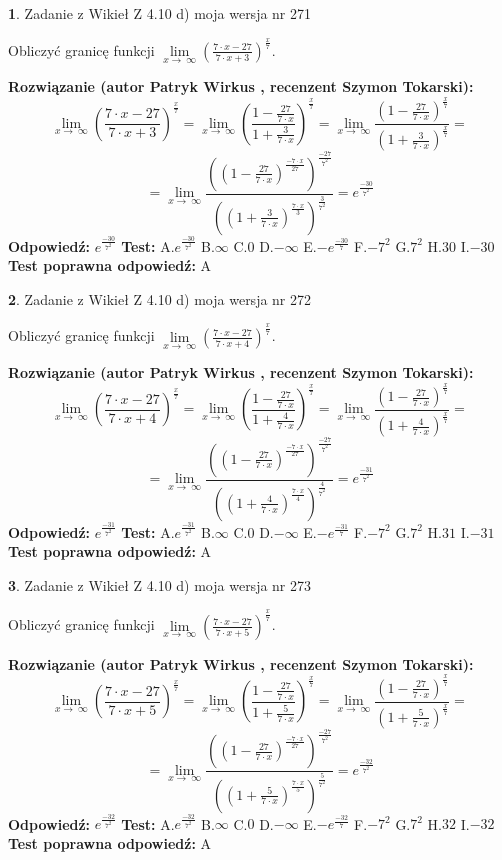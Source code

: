 \documentclass[12pt, a4paper]{article}
\theoremstyle{definition} %
\newtheorem{zad}{}
\newcommand{\zadStart}[1]{\begin{zad}#1\newline}
\newcommand{\zadStop}{\end{zad}}
\newcommand{\rozwStart}[2]{\noindent \textbf{Rozwiązanie (autor #1 , recenzent #2): }\newline}
\newcommand{\rozwStop}{\newline}
\newcommand{\odpStart}{\noindent \textbf{Odpowiedź:}\newline}
\newcommand{\odpStop}{\newline}
\newcommand{\testStart}{\noindent \textbf{Test:}\newline}
\newcommand{\testStop}{\newline}
\newcommand{\kluczStart}{\noindent \textbf{Test poprawna odpowiedź:}\newline}
\newcommand{\kluczStop}{\newline}
\begin{document}
\zadStart{Zadanie z Wikieł Z 4.10 d) moja wersja nr 271}


Obliczyć granicę funkcji  $\lim\limits_{x\to\ \infty}(\frac{7\cdot x-27}{7\cdot x+3})^{\frac{x}{7}}$.
\zadStop
\rozwStart{Patryk Wirkus}{Szymon Tokarski}
$$\lim\limits_{x\to\ \infty}(\frac{7\cdot x-27}{7\cdot x+3})^{\frac{x}{7}} = \lim\limits_{x\to\ \infty}(\frac{1-\frac{27}{7\cdot x}}{1+\frac{3}{7\cdot x}})^{\frac{x}{7}}=\lim\limits_{x\to\ \infty}\frac{(1-\frac{27}{7\cdot x})^{\frac{x}{7}}}{(1+\frac{3}{7\cdot x})^{\frac{x}{7}}}=$$
$$=\lim\limits_{x\to\ \infty}\frac{((1-\frac{27}{7\cdot x})^{\frac{-7\cdot x}{27}})^{\frac{-27}{7^{2}}}}{((1+\frac{3}{7\cdot x})^{\frac{7\cdot x}{3}})^{\frac{3}{7^{2}}}}=e^{\frac{-30}{7^{2}}}$$
\rozwStop
\odpStart
$e^{\frac{-30}{7^{2}}}$
\odpStop
\testStart
A.$e^{\frac{-30}{7^{2}}}$ B.$\infty$ C.$0$ D.$-\infty$ E.$-e^{\frac{-30}{7}}$
F.$-7^{2}$ G.$7^{2}$
H.$30$
I.$-30$
\testStop
\kluczStart
A
\kluczStop



\zadStart{Zadanie z Wikieł Z 4.10 d) moja wersja nr 272}


Obliczyć granicę funkcji  $\lim\limits_{x\to\ \infty}(\frac{7\cdot x-27}{7\cdot x+4})^{\frac{x}{7}}$.
\zadStop
\rozwStart{Patryk Wirkus}{Szymon Tokarski}
$$\lim\limits_{x\to\ \infty}(\frac{7\cdot x-27}{7\cdot x+4})^{\frac{x}{7}} = \lim\limits_{x\to\ \infty}(\frac{1-\frac{27}{7\cdot x}}{1+\frac{4}{7\cdot x}})^{\frac{x}{7}}=\lim\limits_{x\to\ \infty}\frac{(1-\frac{27}{7\cdot x})^{\frac{x}{7}}}{(1+\frac{4}{7\cdot x})^{\frac{x}{7}}}=$$
$$=\lim\limits_{x\to\ \infty}\frac{((1-\frac{27}{7\cdot x})^{\frac{-7\cdot x}{27}})^{\frac{-27}{7^{2}}}}{((1+\frac{4}{7\cdot x})^{\frac{7\cdot x}{4}})^{\frac{4}{7^{2}}}}=e^{\frac{-31}{7^{2}}}$$
\rozwStop
\odpStart
$e^{\frac{-31}{7^{2}}}$
\odpStop
\testStart
A.$e^{\frac{-31}{7^{2}}}$ B.$\infty$ C.$0$ D.$-\infty$ E.$-e^{\frac{-31}{7}}$
F.$-7^{2}$ G.$7^{2}$
H.$31$
I.$-31$
\testStop
\kluczStart
A
\kluczStop



\zadStart{Zadanie z Wikieł Z 4.10 d) moja wersja nr 273}


Obliczyć granicę funkcji  $\lim\limits_{x\to\ \infty}(\frac{7\cdot x-27}{7\cdot x+5})^{\frac{x}{7}}$.
\zadStop
\rozwStart{Patryk Wirkus}{Szymon Tokarski}
$$\lim\limits_{x\to\ \infty}(\frac{7\cdot x-27}{7\cdot x+5})^{\frac{x}{7}} = \lim\limits_{x\to\ \infty}(\frac{1-\frac{27}{7\cdot x}}{1+\frac{5}{7\cdot x}})^{\frac{x}{7}}=\lim\limits_{x\to\ \infty}\frac{(1-\frac{27}{7\cdot x})^{\frac{x}{7}}}{(1+\frac{5}{7\cdot x})^{\frac{x}{7}}}=$$
$$=\lim\limits_{x\to\ \infty}\frac{((1-\frac{27}{7\cdot x})^{\frac{-7\cdot x}{27}})^{\frac{-27}{7^{2}}}}{((1+\frac{5}{7\cdot x})^{\frac{7\cdot x}{5}})^{\frac{5}{7^{2}}}}=e^{\frac{-32}{7^{2}}}$$
\rozwStop
\odpStart
$e^{\frac{-32}{7^{2}}}$
\odpStop
\testStart
A.$e^{\frac{-32}{7^{2}}}$ B.$\infty$ C.$0$ D.$-\infty$ E.$-e^{\frac{-32}{7}}$
F.$-7^{2}$ G.$7^{2}$
H.$32$
I.$-32$
\testStop
\kluczStart
A
\kluczStop
\end{document}
